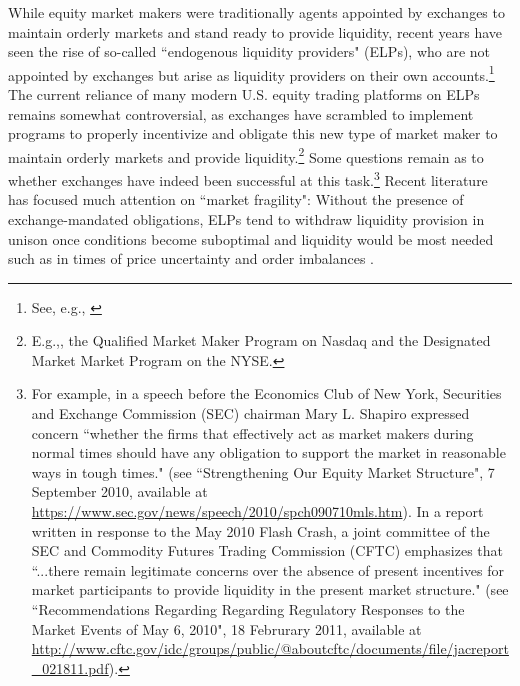 \documentclass{article}
\begin{document}
While equity market makers were traditionally agents appointed by exchanges to maintain orderly markets and stand ready to provide liquidity, recent years have seen the rise of so-called ``endogenous liquidity providers" (ELPs), who are not appointed by exchanges but arise as liquidity providers on their own accounts.\footnote{See, e.g., \citet{bessembinder2015market,anand2016market}} The current reliance of many modern U.S. equity trading platforms on ELPs remains somewhat controversial, as exchanges have scrambled to implement programs to properly incentivize and obligate this new type of market maker to maintain orderly markets and provide liquidity.\footnote{E.g.,, the Qualified Market Maker Program on Nasdaq and the Designated Market Market Program on the NYSE.} Some questions remain as to whether exchanges have indeed been successful at this task.\footnote{For example, in a speech before the Economics Club of New York, Securities and Exchange Commission (SEC) chairman Mary L. Shapiro expressed concern ``whether the firms that effectively act as market makers during normal times should have any obligation to support the market in reasonable ways in tough times." (see ``Strengthening Our Equity Market Structure", 7 September 2010, available at \url{https://www.sec.gov/news/speech/2010/spch090710mls.htm}). In a report written in response to the May 2010 Flash Crash, a joint committee of the SEC and Commodity Futures Trading Commission (CFTC) emphasizes that ``...there remain legitimate concerns over the absence of present incentives for market participants to provide liquidity in the present market structure." (see ``Recommendations Regarding Regarding Regulatory Responses to the Market Events of May 6, 2010", 18 Februrary 2011, available at \url{http://www.cftc.gov/idc/groups/public/@aboutcftc/documents/file/jacreport_021811.pdf}).} Recent literature has focused much attention on ``market fragility": Without the presence of exchange-mandated obligations, ELPs tend to withdraw liquidity provision in unison once conditions become suboptimal and liquidity would be most needed such as in times of price uncertainty and order imbalances \citep[see, e.g.,][]{bessembinder2015market,anand2016market}. 
\end{document}
